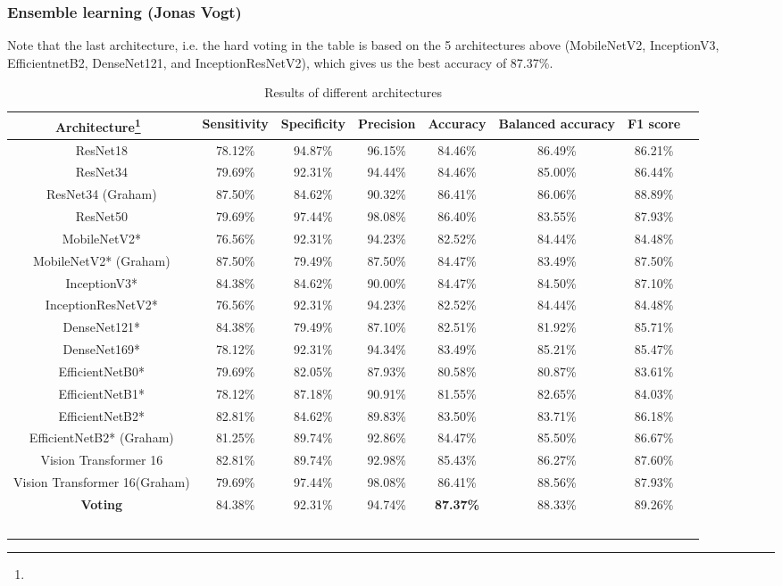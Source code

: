 \documentclass{article}
\begin{document}
\subsubsection{Ensemble learning (Jonas Vogt)}
Note that the last architecture, i.e. the hard voting in the table is based on the 5 architectures above (MobileNetV2, InceptionV3, EfficientnetB2, DenseNet121, and InceptionResNetV2), which gives us the best accuracy of 87.37\%.

\begin{table}
\caption{Results of different architectures}
\begin{tabular}{cccccccc}
\toprule
Architecture\footnote{}\	&Sensitivity	&Specificity	&Precision&	Accuracy	&Balanced accuracy	&F1 score \\
\midrule
ResNet18	&78.12\% &	94.87\%	&96.15\%	&84.46\%	&86.49\%	&86.21\%\\
ResNet34	&79.69\%	&92.31\%	&94.44\%	&84.46\%	&85.00\%	&86.44\%\\
ResNet34 (Graham) 	&87.50\%	&84.62\%	&90.32\%	&86.41\%	&86.06\%	&88.89\%	\\
ResNet50	&79.69\%	&97.44\%	&98.08\%	&86.40\%	&83.55\%	&87.93\%\\
MobileNetV2*	&76.56\%	&92.31\%	&94.23\%	&82.52\%	&84.44\%	&84.48\%\\
MobileNetV2* (Graham)	&87.50\%	&79.49\%	&87.50\%	&84.47\%	&83.49\%	&87.50\%	\\
InceptionV3*	&84.38\%	&84.62\%	&90.00\%	&84.47\%	&84.50\%	&87.10\%\\
InceptionResNetV2*	&76.56\%	&92.31\%	&94.23\%	&82.52\%	&84.44\%	&84.48\%\\
DenseNet121*	&84.38\%	&79.49\%	&87.10\%	&82.51\%	&81.92\%	&85.71\%\\
DenseNet169*	&78.12\%	&92.31\%	&94.34\%	&83.49\%	&85.21\%	&85.47\%\\
EfficientNetB0*	&79.69\%	&82.05\%	&87.93\%	&80.58\%	&80.87\%	&83.61\%\\
EfficientNetB1*	&78.12\%	&87.18\%	&90.91\%	&81.55\%	&82.65\%	&84.03\%\\
EfficientNetB2*	&82.81\%	&84.62\%	&89.83\%	&83.50\%	&83.71\%	&86.18\%\\
EfficientNetB2* (Graham)	&81.25\%	&89.74\%	&92.86\%	&84.47\%	&85.50\%	&86.67\%\\
Vision Transformer 16	&82.81\%	&89.74\%	&92.98\%	&85.43\%	&86.27\%	&87.60\%\\
Vision Transformer 16(Graham)	&79.69\%	&97.44\%	&98.08\%	&86.41\%	&88.56\%	&87.93\%\\
\textbf{Voting}	&84.38\%	&92.31\%	&94.74\%	&\textbf{87.37\%}	&88.33\%	&89.26\%\\

   \bottomrule
\
\label{tab:table1}
\end{tabular}
\end{table}
\end{document}
